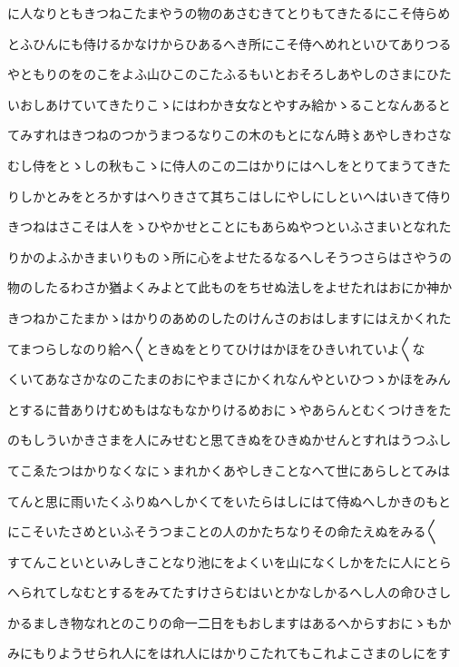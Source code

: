 \documentclass[a4paper,11pt,landscape]{ltjtarticle}
\begin{document}
に人なりともきつねこたまやうの物のあさむきてとりもてきたるにこそ侍らめ
\par\medskip
とふひんにも侍けるかなけからひあるへき所にこそ侍へめれといひてありつる
\par\medskip
やともりのをのこをよふ山ひこのこたふるもいとおそろしあやしのさまにひた
\par\medskip
いおしあけていてきたりこゝにはわかき女なとやすみ給かゝることなんあると
\par\medskip
てみすれはきつねのつかうまつるなりこの木のもとになん時〻あやしきわさな
\par\medskip
むし侍をとゝしの秋もこゝに侍人のこの二はかりにはへしをとりてまうてきた
\par\medskip
りしかとみをとろかすはへりきさて其ちこはしにやしにしといへはいきて侍り
\par\medskip
きつねはさこそは人をゝひやかせとことにもあらぬやつといふさまいとなれた
\par\medskip
りかのよふかきまいりものゝ所に心をよせたるなるへしそうつさらはさやうの
\par\medskip
物のしたるわさか猶よくみよとて此ものをちせぬ法しをよせたれはおにか神か
\par\medskip
きつねかこたまかゝはかりのあめのしたのけんさのおはしますにはえかくれた
\par\medskip
てまつらしなのり給へ〱ときぬをとりてひけはかほをひきいれていよ〱な
\par\medskip
くいてあなさかなのこたまのおにやまさにかくれなんやといひつゝかほをみん
\par\medskip
とするに昔ありけむめもはなもなかりけるめおにゝやあらんとむくつけきをた
\par\medskip
のもしういかきさまを人にみせむと思てきぬをひきぬかせんとすれはうつふし
\par\medskip
てこゑたつはかりなくなにゝまれかくあやしきことなへて世にあらしとてみは
\par\medskip
てんと思に雨いたくふりぬへしかくてをいたらはしにはて侍ぬへしかきのもと
\par\medskip
にこそいたさめといふそうつまことの人のかたちなりその命たえぬをみる〱
\par\medskip
すてんこといといみしきことなり池にをよくいを山になくしかをたに人にとら
\par\medskip
へられてしなむとするをみてたすけさらむはいとかなしかるへし人の命ひさし
\par\medskip
かるましき物なれとのこりの命一二日をもおしますはあるへからすおにゝもか
\par\medskip
みにもりようせられ人にをはれ人にはかりこたれてもこれよこさまのしにをす
\end{document}
